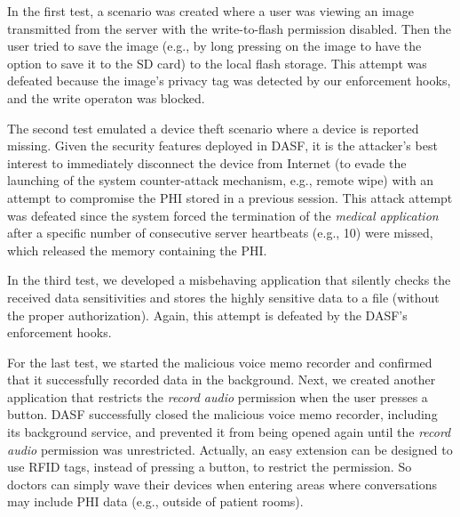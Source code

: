In the first test, a scenario was created where a user was viewing an image
transmitted from the server with the write-to-flash permission disabled.  Then
the user tried to save the image (e.g., by long pressing on the image to have
the option to save it to the SD card) to the local flash storage.  This attempt
was defeated because the image's privacy tag was detected by our enforcement
hooks, and the write operaton was blocked.


The second test emulated a device theft scenario where a device is reported
missing. Given the security features deployed in DASF, it is the attacker's
best interest to immediately disconnect the device from Internet (to evade the
launching of the system counter-attack mechanism, e.g., remote wipe) with an
attempt to compromise the PHI stored in a previous session. This attack attempt
was defeated since the system forced the termination of the \textit{medical
application} after a specific number of consecutive server heartbeats (e.g.,
10) were missed, which released the memory containing the PHI.


In the third test, we developed a misbehaving application that
silently checks the received data sensitivities and stores the highly
sensitive data to a file (without the proper authorization). Again,
this attempt is defeated by the DASF's enforcement hooks. 


For the last test, we started the malicious
voice memo recorder and confirmed that it successfully recorded data
in the background.  Next, we created another application that
restricts the \textit{record audio} permission when the user presses a
button. DASF successfully closed the malicious voice memo recorder,
including its background service, and prevented it from being opened
again until the \textit{record audio} permission was
unrestricted. Actually, an easy extension can be designed to use RFID
tags, instead of pressing a button, to restrict the permission. So
doctors can simply wave their devices when entering areas where
conversations may include PHI data (e.g., outside of patient rooms).  

